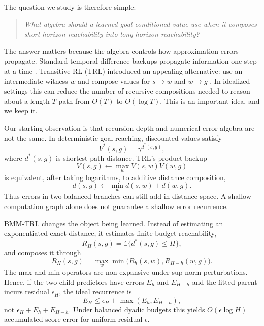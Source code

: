 \documentclass[11pt]{article}
\newcommand{\ind}{\mathbb{1}}
\begin{document}
The question we study is therefore simple:
\begin{quote}
\emph{What algebra should a learned goal-conditioned value use when it composes
short-horizon reachability into long-horizon reachability?}
\end{quote}
The answer matters because the algebra controls how approximation errors
propagate. Standard temporal-difference backups propagate information one step at
a time \citep{sutton1988td,watkins1992qlearning}. Transitive RL (TRL) introduced
an appealing alternative: use an intermediate witness $w$ and compose values for
$s\to w$ and $w\to g$ \citep{park2025trl}. In idealized settings this can reduce
the number of recursive compositions needed to reason about a length-$T$ path
from $O(T)$ to $O(\log T)$. This is an important idea, and we keep it.

Our starting observation is that recursion depth and numerical error algebra are
not the same. In deterministic goal reaching, discounted values satisfy
\begin{equation}
    V^*(s,g)=\gamma^{d^*(s,g)},
\end{equation}
where $d^*(s,g)$ is shortest-path distance. TRL's product backup
\begin{equation}
    V(s,g) \leftarrow \max_w V(s,w)V(w,g)
\end{equation}
is equivalent, after taking logarithms, to additive distance composition,
\begin{equation}
    d(s,g) \leftarrow \min_w d(s,w)+d(w,g).
\end{equation}
Thus errors in two balanced branches can still add in distance space. A shallow
computation graph alone does not guarantee a shallow error recurrence.

BMM-TRL changes the object being learned. Instead of estimating an exponentiated
exact distance, it estimates finite-budget reachability,
\begin{equation}
    R_H(s,g)=\ind\{d^*(s,g)\le H\},
\end{equation}
and composes it through
\begin{equation}
    R_H(s,g)=\max_w \min\big(R_h(s,w),R_{H-h}(w,g)\big).
\end{equation}
The max and min operators are non-expansive under sup-norm perturbations. Hence,
if the two child predictors have errors $E_h$ and $E_{H-h}$ and the fitted parent
incurs residual $\epsilon_H$, the ideal recurrence is
\begin{equation}
    E_H \le \epsilon_H + \max(E_h,E_{H-h}),
\end{equation}
not $\epsilon_H+E_h+E_{H-h}$. Under balanced dyadic budgets this yields
$O(\epsilon\log H)$ accumulated score error for uniform residual $\epsilon$.
\end{document}
